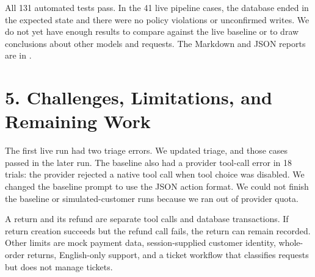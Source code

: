 \documentclass[11pt,a4paper]{article}
\begin{document}
All 131 automated tests pass. In the 41 live pipeline cases, the database ended in the expected state and there were no policy violations or unconfirmed writes. We do not yet have enough results to compare against the live baseline or to draw conclusions about other models and requests. The Markdown and JSON reports are in .

\section*{5. Challenges, Limitations, and Remaining Work}

The first live run had two triage errors. We updated triage, and those cases passed in the later run. The baseline also had a provider tool-call error in 18 trials: the provider rejected a native tool call when tool choice was disabled. We changed the baseline prompt to use the JSON action format. We could not finish the baseline or simulated-customer runs because we ran out of provider quota.

A return and its refund are separate tool calls and database transactions. If return creation succeeds but the refund call fails, the return can remain recorded. Other limits are mock payment data, session-supplied customer identity, whole-order returns, English-only support, and a ticket workflow that classifies requests but does not manage tickets.
\end{document}
